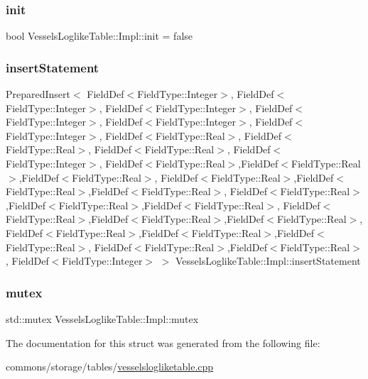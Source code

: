 \subsubsection{\texorpdfstring{init}{init}}
{\footnotesize\ttfamily bool Vessels\+Loglike\+Table\+::\+Impl\+::init = false}

\mbox{\label{struct_vessels_loglike_table_1_1_impl_aa802635b7c589cd6916681024f7df0fd}} 
\subsubsection{\texorpdfstring{insertStatement}{insertStatement}}
{\footnotesize\ttfamily Prepared\+Insert$<$ Field\+Def$<$Field\+Type\+::\+Integer$>$, Field\+Def$<$Field\+Type\+::\+Integer$>$, Field\+Def$<$Field\+Type\+::\+Integer$>$, Field\+Def$<$Field\+Type\+::\+Integer$>$, Field\+Def$<$Field\+Type\+::\+Integer$>$, Field\+Def$<$Field\+Type\+::\+Integer$>$, Field\+Def$<$Field\+Type\+::\+Real$>$, Field\+Def$<$Field\+Type\+::\+Real$>$, Field\+Def$<$Field\+Type\+::\+Real$>$, Field\+Def$<$Field\+Type\+::\+Integer$>$, Field\+Def$<$Field\+Type\+::\+Real$>$,Field\+Def$<$Field\+Type\+::\+Real$>$,Field\+Def$<$Field\+Type\+::\+Real$>$, Field\+Def$<$Field\+Type\+::\+Real$>$,Field\+Def$<$Field\+Type\+::\+Real$>$,Field\+Def$<$Field\+Type\+::\+Real$>$, Field\+Def$<$Field\+Type\+::\+Real$>$,Field\+Def$<$Field\+Type\+::\+Real$>$,Field\+Def$<$Field\+Type\+::\+Real$>$, Field\+Def$<$Field\+Type\+::\+Real$>$,Field\+Def$<$Field\+Type\+::\+Real$>$,Field\+Def$<$Field\+Type\+::\+Real$>$, Field\+Def$<$Field\+Type\+::\+Real$>$,Field\+Def$<$Field\+Type\+::\+Real$>$,Field\+Def$<$Field\+Type\+::\+Real$>$, Field\+Def$<$Field\+Type\+::\+Real$>$,Field\+Def$<$Field\+Type\+::\+Real$>$, Field\+Def$<$Field\+Type\+::\+Integer$>$ $>$ Vessels\+Loglike\+Table\+::\+Impl\+::insert\+Statement}

\mbox{\label{struct_vessels_loglike_table_1_1_impl_a943b01b1bd9f6590130c42b66b7a4b5b}} 
\subsubsection{\texorpdfstring{mutex}{mutex}}
{\footnotesize\ttfamily std\+::mutex Vessels\+Loglike\+Table\+::\+Impl\+::mutex}



The documentation for this struct was generated from the following file\+:\begin{DoxyCompactItemize}
\item 
commons/storage/tables/\mbox{\hyperlink{vesselslogliketable_8cpp}{vesselslogliketable.\+cpp}}\end{DoxyCompactItemize}
